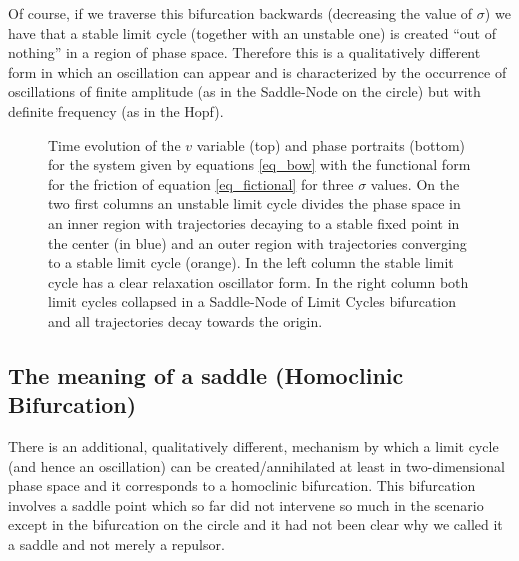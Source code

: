 \documentclass{article}
\begin{document}
Of course, if we traverse this bifurcation backwards (decreasing the value of $\sigma$) we have that a stable limit cycle (together with an unstable one) is created “out of nothing” in a region of phase space. 
Therefore this is a qualitatively different form in which an oscillation can appear and is characterized by the occurrence of oscillations of finite amplitude (as in the Saddle-Node on the circle) but with definite frequency (as in the Hopf).




\begin{figure}[h]
    \centering
    \caption{Time evolution of the $v$ variable (top) and phase portraits (bottom) for the system given by equations \ref{eq_bow} with the functional form for the friction of equation \ref{eq_fictional} for three $\sigma$ values. On the two first columns an unstable limit cycle divides the phase space in an inner region with trajectories decaying to a stable fixed point in the center (in blue) and an outer region with trajectories converging to a stable limit cycle (orange). In the left column the stable limit cycle has a clear relaxation oscillator form. In the right column both limit cycles collapsed in a Saddle-Node of Limit Cycles bifurcation and all trajectories decay towards the origin.} 
    \label{fig_friction2}
    
\end{figure}

\subsection{The meaning of a saddle (Homoclinic Bifurcation)}

There is an additional, qualitatively different, mechanism by which a limit cycle (and hence an oscillation) can be created/annihilated at least in two-dimensional phase space and it corresponds to a homoclinic bifurcation. 
This bifurcation involves a saddle point which so far did not intervene so much in the scenario except in the bifurcation on the circle and it had not been clear why we called it a saddle and not merely a repulsor. 
\end{document}
